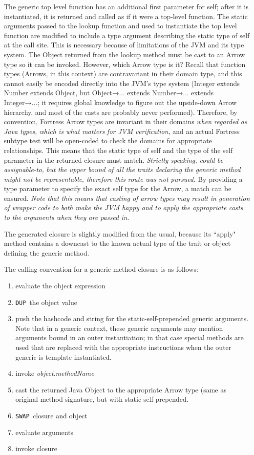 \documentclass[11pt]{article}
\def\RARW{\mbox{\fontspec{STIXGeneral}→}}
\newcommand{\jvm}[1]{{\tt #1}}
\begin{document}
The generic top level function has an additional first parameter for self; after it is instantiated, it is returned and called as if it were a top-level function.  The static arguments passed to the lookup function and used to instantiate the top level function are modified to include a type argument describing the static type of self at the call site.  This is necessary because of limitations of the JVM and its type system.  The Object returned from the lookup method must be cast to an Arrow type so it can be invoked.  However, which Arrow type is it?  Recall that function types (Arrows, in this context) are contravariant in their domain type, and this cannot easily be encoded directly into the JVM's type system (Integer extends Number extends Object, but Object\RARW... extends Number\RARW... extends Integer\RARW...; it requires global knowledge to figure out the upside-down Arrow hierarchy, and most of the casts are probably never performed).  Therefore, by convention, Fortress Arrow types are invariant in their domains {\it when regarded as Java types, which is what matters for JVM verification}, and an actual Fortress subtype test will be open-coded to check the domains for appropriate relationships.  This means that the static type of self and the type of the self parameter in the returned closure must match.  {\it Strictly speaking, could be assignable-to, but the upper bound of all the traits declaring the generic method might not be representable, therefore this route was not pursued.}  By providing a type parameter to specify the exact self type for the Arrow, a match can be ensured.  {\it Note that this means that casting of arrow types may result in generation of wrapper code to both make the JVM happy and to apply the appropriate casts to the arguments when they are passed in.}

The generated closure is slightly modified from the usual, because its ``apply" method contains a downcast to the known actual type of the trait or object defining the generic method.

The calling convention for a generic method closure is as follows:
\begin{enumerate}
\item evaluate the object expression
\item \jvm{DUP}\ the object value
\item push the hashcode and string for the static-self-prepended generic arguments.  Note that in a generic context, these generic arguments may mention arguments bound in an outer instantiation; in that case special methods are used that are replaced with the appropriate instructions when the outer generic is template-instantiated.
\item invoke {\it object}.{\it methodName}
\item cast the returned Java Object to the appropriate Arrow type (same as original method signature, but with static self prepended.
\item \jvm{SWAP}\ closure and object
\item evaluate arguments
\item invoke closure
\end{enumerate}
\end{document}
